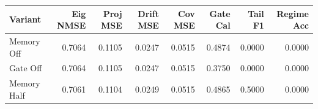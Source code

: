 \begin{tabular}{lrrrrrrr}
\toprule
Variant & Eig NMSE & Proj MSE & Drift MSE & Cov MSE & Gate Cal & Tail F1 & Regime Acc \\
\midrule
Memory Off & 0.7064 & 0.1105 & 0.0247 & 0.0515 & 0.4874 & 0.0000 & 0.0000 \\
Gate Off & 0.7064 & 0.1105 & 0.0247 & 0.0515 & 0.3750 & 0.0000 & 0.0000 \\
Memory Half & 0.7061 & 0.1104 & 0.0249 & 0.0515 & 0.4865 & 0.5000 & 0.0000 \\
\bottomrule
\end{tabular}